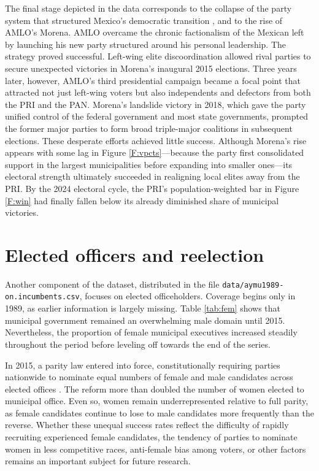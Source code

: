 \documentclass[letter,12pt]{article}
\begin{document}
The final stage depicted in the data corresponds to the collapse of the party system that structured Mexico's democratic transition \citep{moreno.decisElec.2009}, and to the rise of AMLO's Morena. AMLO overcame the chronic factionalism of the Mexican left \citep{bruhn.1997} by launching his new party structured around his personal leadership. The strategy proved successful. Left-wing elite discoordination allowed rival parties to secure unexpected victories in Morena's inaugural 2015 elections. Three years later, however, AMLO's third presidential campaign became a focal point that attracted not just left-wing voters but also independents and defectors from both the PRI and the PAN. Morena's landslide victory in 2018, which gave the party unified control of the federal government and most state governments, prompted the former major parties to form broad triple-major coalitions in subsequent elections. These desperate efforts achieved little success. Although Morena's rise appears with some lag in Figure \ref{F:vpcts}---because the party first consolidated support in the largest municipalities before expanding into smaller ones---its electoral strength ultimately succeeded in realigning local elites away from the PRI. By the 2024 electoral cycle, the PRI's population-weighted bar in Figure \ref{F:win} had finally fallen below its already diminished share of municipal victories.

\section{Elected officers and reelection}\label{S:incumbents}

Another component of the dataset, distributed in the file \verb|data/aymu1989-on.incumbents.csv|, focuses on elected officeholders. Coverage begins only in 1989, as earlier information is largely missing. Table \ref{tab:fem} shows that municipal government remained an overwhelming male domain until 2015. Nevertheless, the proportion of female municipal executives increased steadily throughout the period before leveling off towards the end of the series.

In 2015, a parity law entered into force, constitutionally requiring parties nationwide to nominate equal numbers of female and male candidates across elected offices \citep{piscopo.2016}. The reform more than doubled the number of women elected to municipal office. Even so, women remain underrepresented relative to full parity, as female candidates continue to lose to male candidates more frequently than the reverse. Whether these unequal success rates reflect the difficulty of rapidly recruiting experienced female candidates, the tendency of parties to nominate women in less competitive races, anti-female bias among voters, or other factors remains an important subject for future research. 
\end{document}
